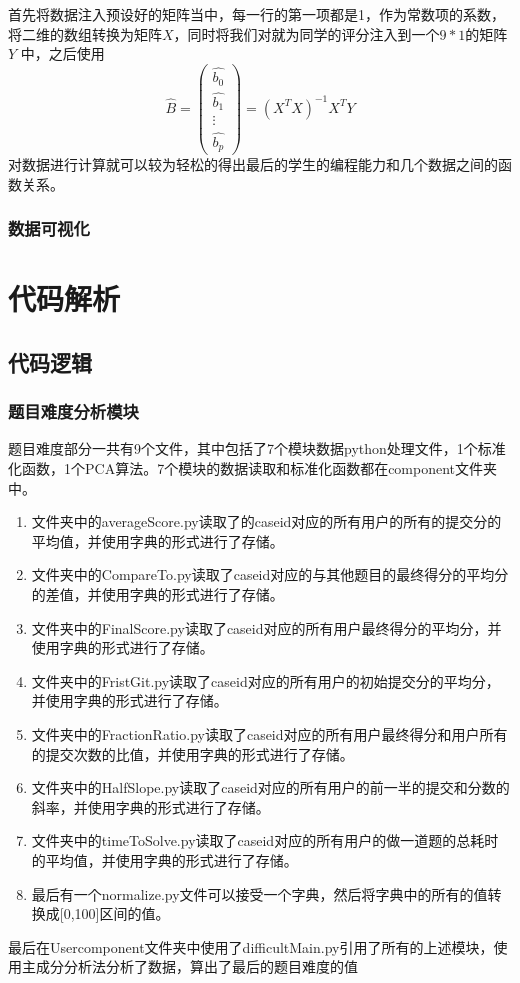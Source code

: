 \documentclass[UTF8]{ctexart}
\begin{document}
首先将数据注入预设好的矩阵当中，每一行的第一项都是1，作为常数项的系数，将二维的数组转换为矩阵$X$，同时将我们对就为同学的评分注入到一个$9*1$的矩阵$Y$
中，之后使用\boldmath$$\hat{B}=\begin{pmatrix}
    \hat{b_0}\\\hat{b_1}\\\vdots\\\hat{b_p}
\end{pmatrix}=(X^TX)^{-1}X^TY$$\unboldmath
对数据进行计算就可以较为轻松的得出最后的学生的编程能力和几个数据之间的函数关系。
\subsubsection{数据可视化}
\section{代码解析}
\subsection{代码逻辑}
\subsubsection{题目难度分析模块}
题目难度部分一共有9个文件，其中包括了7个模块数据python处理文件，1个标准化函数，1个PCA算法。7个模块的数据读取和标准化函数都在component文件夹中。

\begin{enumerate}

    \item 文件夹中的averageScore.py读取了的caseid对应的所有用户的所有的提交分的平均值，并使用字典的形式进行了存储。
    \item 文件夹中的CompareTo.py读取了caseid对应的与其他题目的最终得分的平均分的差值，并使用字典的形式进行了存储。
    \item 文件夹中的FinalScore.py读取了caseid对应的所有用户最终得分的平均分，并使用字典的形式进行了存储。
    \item 文件夹中的FristGit.py读取了caseid对应的所有用户的初始提交分的平均分，并使用字典的形式进行了存储。
    \item 文件夹中的FractionRatio.py读取了caseid对应的所有用户最终得分和用户所有的提交次数的比值，并使用字典的形式进行了存储。
    \item 文件夹中的HalfSlope.py读取了caseid对应的所有用户的前一半的提交和分数的斜率，并使用字典的形式进行了存储。
    \item 文件夹中的timeToSolve.py读取了caseid对应的所有用户的做一道题的总耗时的平均值，并使用字典的形式进行了存储。
    \item 最后有一个normalize.py文件可以接受一个字典，然后将字典中的所有的值转换成[0,100]区间的值。

\end{enumerate}
最后在Usercomponent文件夹中使用了difficultMain.py引用了所有的上述模块，使用主成分分析法分析了数据，算出了最后的题目难度的值
\end{document}
